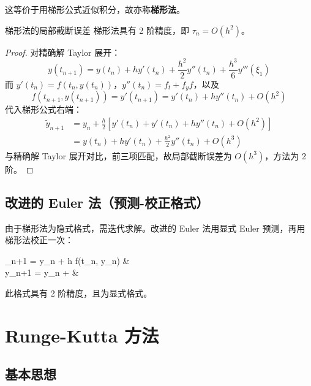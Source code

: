 这等价于用梯形公式近似积分，故亦称\textbf{梯形法}。

\begin{theorem}{梯形法的局部截断误差}
	梯形法具有 2 阶精度，即 $\tau_n = O(h^2)$。
\end{theorem}

\begin{proof}
	对精确解 Taylor 展开：
	\[
	y(t_{n+1}) = y(t_n) + h y'(t_n) + \frac{h^2}{2} y''(t_n) + \frac{h^3}{6} y'''(\xi_1)
	\]
	而 $y'(t_n) = f(t_n, y(t_n))$，$y''(t_n) = f_t + f_y f$，以及
	\[
	f(t_{n+1}, y(t_{n+1})) = y'(t_{n+1}) = y'(t_n) + h y''(t_n) + O(h^2)
	\]
	代入梯形公式右端：
	\begin{align*}
		\tilde{y}_{n+1} &= y_n + \frac{h}{2} \left[ y'(t_n) + y'(t_n) + h y''(t_n) + O(h^2) \right] \\
		&= y(t_n) + h y'(t_n) + \frac{h^2}{2} y''(t_n) + O(h^3)
	\end{align*}
	与精确解 Taylor 展开对比，前三项匹配，故局部截断误差为 $O(h^3)$，方法为 2 阶。
\end{proof}

\subsection{改进的 Euler 法（预测-校正格式）}

由于梯形法为隐式格式，需迭代求解。改进的 Euler 法用显式 Euler 预测，再用梯形法校正一次：
\begin{myformula}
	\begin{cases}
		_{n+1} = y_n + h f(t_n, y_n) &  \\[5pt]
		y_{n+1} = y_n +   & 
	\end{cases}
\end{myformula}

此格式具有 2 阶精度，且为显式格式。

\section{Runge-Kutta 方法}

\subsection{基本思想}

